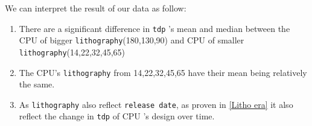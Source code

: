 We can interpret the result of our data as follow:
\begin{enumerate}
    \item There are a significant difference in \verb|tdp| 's mean and median between the CPU of bigger \verb|lithography|(180,130,90) and CPU of smaller \verb|lithography|(14,22,32,45,65)
    \item The CPU's \verb|lithography| from 14,22,32,45,65 have their mean being relatively the same.
    \item As \verb|lithography| also reflect \verb|release date|, as proven in \ref{Litho era} it also reflect the change in \verb|tdp| of CPU 's design over time.

    
\end{enumerate}











